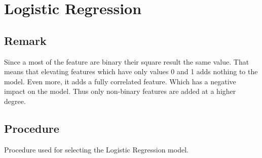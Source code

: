 \documentclass{article}
\begin{document}
\section{Logistic Regression}
\subsection{Remark}

Since a most of the feature are binary their square result the same value. That means that elevating features which have only values 0 and 1 adds nothing to the model. Even more, it adds a fully correlated feature. Which has a negative impact on the model. Thus only non-binary features are added at a higher degree.
\\
\subsection{Procedure}

Procedure used for selecting the Logistic Regression model.
\end{document}

